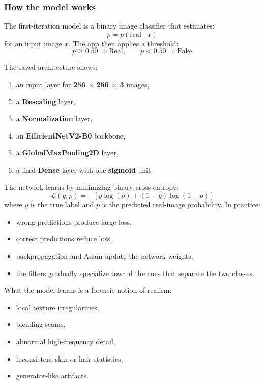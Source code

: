 \documentclass[11pt]{article}
\begin{document}
\subsubsection{How the model works}
The first-iteration model is a binary image classifier that estimates:
\[
p = p(\text{real}\mid x)
\]
for an input image \(x\). The app then applies a threshold:
\[
p \ge 0.50 \Rightarrow \text{Real}, \qquad p < 0.50 \Rightarrow \text{Fake}
\]

The saved architecture shows:
\begin{enumerate}[leftmargin=1.5em]
    \item an input layer for \textbf{256 $\times$ 256 $\times$ 3} images,
    \item a \textbf{Rescaling} layer,
    \item a \textbf{Normalization} layer,
    \item an \textbf{EfficientNetV2-B0} backbone,
    \item a \textbf{GlobalMaxPooling2D} layer,
    \item a final \textbf{Dense} layer with one \textbf{sigmoid} unit.
\end{enumerate}

The network learns by minimizing binary cross-entropy:
\[
\mathcal{L}(y,p) = -\left[y\log(p) + (1-y)\log(1-p)\right]
\]
where \(y\) is the true label and \(p\) is the predicted real-image probability. In practice:
\begin{itemize}[leftmargin=1.5em]
    \item wrong predictions produce large loss,
    \item correct predictions reduce loss,
    \item backpropagation and Adam update the network weights,
    \item the filters gradually specialize toward the cues that separate the two classes.
\end{itemize}

What the model learns is a forensic notion of realism:
\begin{itemize}[leftmargin=1.5em]
    \item local texture irregularities,
    \item blending seams,
    \item abnormal high-frequency detail,
    \item inconsistent skin or hair statistics,
    \item generator-like artifacts.
\end{itemize}
\end{document}
